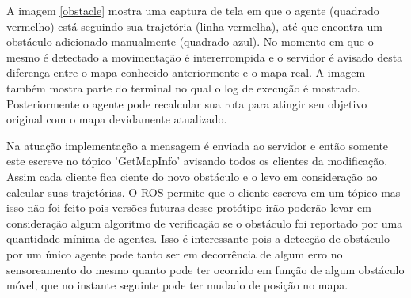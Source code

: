 \documentclass[eq,capa]{texufpel}
\begin{document}
A imagem \ref{obstacle} mostra uma captura de tela em que o agente (quadrado vermelho) está seguindo sua trajetória (linha vermelha), até que encontra um obstáculo adicionado manualmente (quadrado azul). No momento em que o mesmo é detectado a movimentação é intererrompida e o servidor é avisado desta diferença entre o mapa conhecido anteriormente e o mapa real. A imagem também mostra parte do terminal no qual o log de execução é mostrado. Posteriormente o agente pode recalcular sua rota para atingir seu objetivo original com o mapa devidamente atualizado.




Na atuação implementação a mensagem é enviada ao servidor e então somente este escreve no tópico 'GetMapInfo' avisando todos os clientes da modificação. Assim cada cliente fica ciente do novo obstáculo e o levo em consideração ao calcular suas trajetórias. O ROS permite que o cliente escreva em um tópico mas isso não foi feito pois versões futuras desse protótipo irão poderão levar em consideração algum algoritmo de verificação se o obstáculo foi reportado por uma quantidade mínima de agentes. Isso é interessante pois a detecção de obstáculo por um único agente pode tanto ser em decorrência de algum erro no sensoreamento do mesmo quanto pode ter ocorrido em função de algum obstáculo móvel, que no instante seguinte pode ter mudado de posição no mapa.
\end{document}
